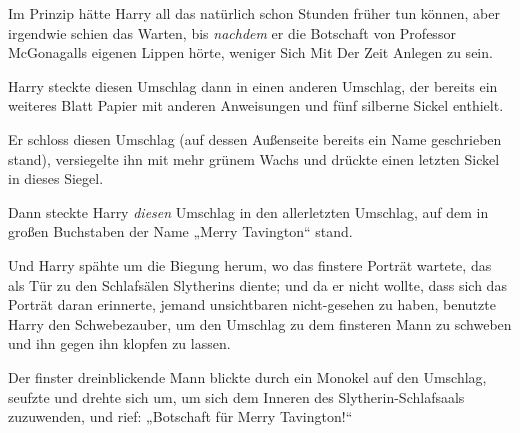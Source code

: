 Im Prinzip hätte Harry all das natürlich schon Stunden früher tun können, aber irgendwie schien das Warten, bis \emph{nachdem} er die Botschaft von Professor McGonagalls eigenen Lippen hörte, weniger Sich Mit Der Zeit Anlegen zu sein.

Harry steckte diesen Umschlag dann in einen anderen Umschlag, der bereits ein weiteres Blatt Papier mit anderen Anweisungen und fünf silberne Sickel enthielt.

Er schloss diesen Umschlag (auf dessen Außenseite bereits ein Name geschrieben stand), versiegelte ihn mit mehr grünem Wachs und drückte einen letzten Sickel in dieses Siegel.

Dann steckte Harry \emph{diesen} Umschlag in den allerletzten Umschlag, auf dem in großen Buchstaben der Name „Merry Tavington“ stand.

Und Harry spähte um die Biegung herum, wo das finstere Porträt wartete, das als Tür zu den Schlafsälen Slytherins diente; und da er nicht wollte, dass sich das Porträt daran erinnerte, jemand unsichtbaren nicht-gesehen zu haben, benutzte Harry den Schwebezauber, um den Umschlag zu dem finsteren Mann zu schweben und ihn gegen ihn klopfen zu lassen.

Der finster dreinblickende Mann blickte durch ein Monokel auf den Umschlag, seufzte und drehte sich um, um sich dem Inneren des Slytherin-Schlafsaals zuzuwenden, und rief: „Botschaft für Merry Tavington!“

